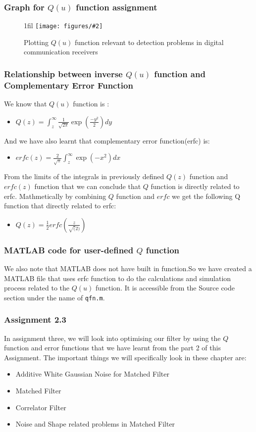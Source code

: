 \documentclass{beamer}
\makeatletter
\newcommand{\code}[1]{\texttt{#1}}
\newcommand*{\centerfloat}{%
  \parindent \z@
  \leftskip \z@ \@plus 1fil \@minus \textwidth
  \rightskip\leftskip
  \parfillskip \z@skip}
\newcommand{\fig}[3]{
  \begin{figure}[H]
  \centerfloat
    \texttt{[image: figures/\#2]}
    \caption{#3}
  \end{figure}
}
\makeatother
\begin{document}
\begin{frame}
	\frametitle{Graph for $Q(u)$ function assignment}
\fig{5cm}{question2_32_4.png}{Plotting $Q(u)$ function relevant to detection problems in digital communication receivers}
\end{frame}

\begin{frame}
	\frametitle{Relationship between inverse $Q(u)$ function and Complementary Error Function }
We know that $Q(u)$ function is :
\begin{itemize}
	\item $Q(z) = \int_{z}^{\infty} \frac{1}{\sqrt{2 \pi}} \exp(\frac{-y^2} {2}) dy$
\end{itemize}

And we have also learnt that complementary error function(erfc) is:
\begin{itemize}
	\item $erfc(z)= \frac{2}{\sqrt{\pi}} \int_{z}^{\infty} \exp(-x^2) dx$
\end{itemize}

From the limits of the integrals in previously defined $Q(z)$ function and $erfc(z)$ function that we can conclude that $Q$ function is directly related to erfc. Mathmetically by combining $Q$ function and $erfc$  we get the following Q function that directly related to erfc:

\begin{itemize}
	\item $Q(z)= \frac{1}{2} erfc(\frac{z}{\sqrt(2)})$
\end{itemize}
\end{frame}

\begin{frame}
	\frametitle{MATLAB code for user-defined $Q$ function}
We also note that MATLAB does not have built in function.So we have created a MATLAB file that uses erfc function to do the calculations and simulation process related to the $Q(u)$ function. It is accessible from the Source code section under the name of \code{qfn.m}.
\end{frame}

\begin{frame}
	\frametitle { Assignment 2.3}
In assignment three, we will look into optimising our filter by using the $Q$ function and error functions that we have learnt from the part 2 of this Assignment. The important things we will specifically look in these chapter are:
\begin{itemize}
	\item Additive White Gaussian Noise for Matched Filter
	\item Matched Filter
	\item Correlator Filter
	\item Noise and Shape related problems in Matched Filter
\end{itemize}
\end{frame}
\end{document}
